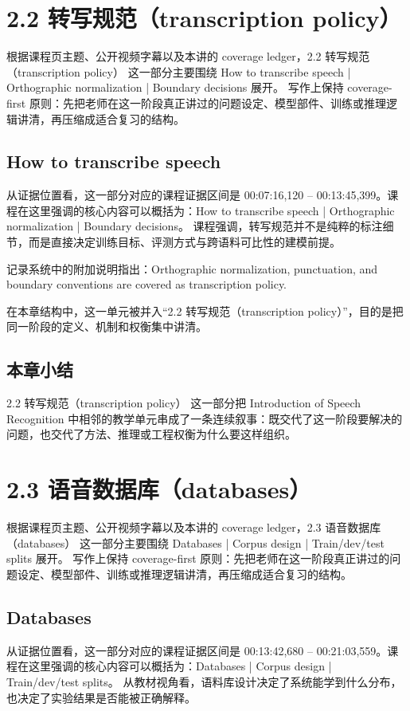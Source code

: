 \documentclass[a4paper]{article}
\begin{document}
\section{2.2 转写规范（transcription policy）}
根据课程页主题、公开视频字幕以及本讲的 coverage ledger，2.2 转写规范（transcription policy） 这一部分主要围绕 How to transcribe speech | Orthographic normalization | Boundary decisions 展开。
写作上保持 coverage-first 原则：先把老师在这一阶段真正讲过的问题设定、模型部件、训练或推理逻辑讲清，再压缩成适合复习的结构。

\subsection{How to transcribe speech}
从证据位置看，这一部分对应的课程证据区间是 00:07:16,120 -- 00:13:45,399。课程在这里强调的核心内容可以概括为：How to transcribe speech | Orthographic normalization | Boundary decisions。
课程强调，转写规范并不是纯粹的标注细节，而是直接决定训练目标、评测方式与跨语料可比性的建模前提。

记录系统中的附加说明指出：Orthographic normalization, punctuation, and boundary conventions are covered as transcription policy.

在本章结构中，这一单元被并入“2.2 转写规范（transcription policy）”，目的是把同一阶段的定义、机制和权衡集中讲清。

\subsection{本章小结}
2.2 转写规范（transcription policy） 这一部分把 Introduction of Speech Recognition 中相邻的教学单元串成了一条连续叙事：既交代了这一阶段要解决的问题，也交代了方法、推理或工程权衡为什么要这样组织。

\section{2.3 语音数据库（databases）}
根据课程页主题、公开视频字幕以及本讲的 coverage ledger，2.3 语音数据库（databases） 这一部分主要围绕 Databases | Corpus design | Train/dev/test splits 展开。
写作上保持 coverage-first 原则：先把老师在这一阶段真正讲过的问题设定、模型部件、训练或推理逻辑讲清，再压缩成适合复习的结构。

\subsection{Databases}
从证据位置看，这一部分对应的课程证据区间是 00:13:42,680 -- 00:21:03,559。课程在这里强调的核心内容可以概括为：Databases | Corpus design | Train/dev/test splits。
从教材视角看，语料库设计决定了系统能学到什么分布，也决定了实验结果是否能被正确解释。
\end{document}
